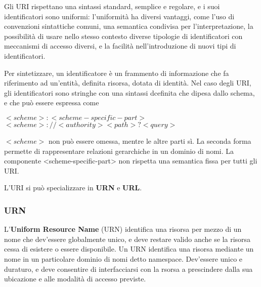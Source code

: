             \vspace{3mm}
            
            Gli URI rispettano una sintassi standard, semplice e regolare, e i suoi identificatori sono uniformi: l'uniformità ha diversi vantaggi, come l'uso di convenzioni sintattiche comuni, una semantica condivisa per l'interpretazione, la possibilità di usare nello stesso contesto diverse tipologie di identificatori con meccanismi di accesso diversi, e la facilità nell'introduzione di nuovi tipi di identificatori.
            
            \vspace{3mm}
            
            Per sintetizzare, un identificatore è un frammento di informazione che fa riferimento ad un'entità, definita risorsa, dotata di identità. Nel caso degli URI, gli identificatori sono stringhe con una sintassi dcefinita che dipesa dallo schema, e che può essere espressa come
            
            \begin{center}
            \(<scheme>:<scheme-specific-part>\)
            \(<scheme>://<authority><path>?<query>\)
            \end{center}
            
            \(<scheme>\) non può essere omessa, mentre le altre parti sì. La seconda forma permette di rappresentare relazioni gerarchiche in un dominio di nomi. La componente <scheme-specific-part> non rispetta una semantica fissa per tutti gli URI.
            
            \vspace{3mm}
            
            L'URI si può specializzare in \textbf{URN} e \textbf{URL}.
        
        \subsubsection{URN}
        
            L'\textbf{Uniform Resource Name} (URN) identifica una risorsa per mezzo di un nome che dev'essere globalmente unico, e deve restare valido anche se la risorsa cessa di esistere o essere disponibile. 
            Un URN identifica una risorsa mediante un nome in un particolare dominio di nomi detto namespace. Dev'essere unico e duraturo, e deve consentire di interfacciarsi con la rsorsa a prescindere dalla sua ubicazione e alle modalità di accesso previste. 
            
